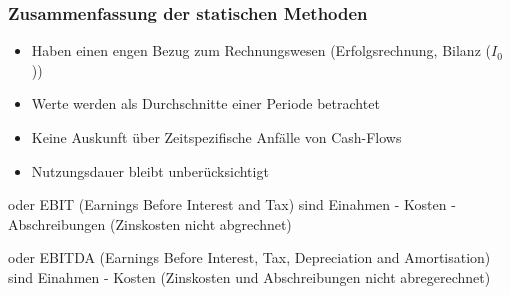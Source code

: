 \subsubsection{Zusammenfassung der statischen Methoden}
\begin{itemize}
    \item Haben einen engen Bezug zum Rechnungswesen (Erfolgsrechnung, Bilanz ($I_0$))
    \item Werte werden als Durchschnitte einer Periode betrachtet
    \item Keine Auskunft über Zeitspezifische Anfälle von Cash-Flows
    \item Nutzungsdauer bleibt unberücksichtigt
\end{itemize} 

\begin{definition}
     oder EBIT (Earnings Before Interest and Tax) sind Einahmen - Kosten - Abschreibungen (Zinskosten nicht abgrechnet)
\end{definition}
\begin{definition}
     oder EBITDA (Earnings Before Interest, Tax, Depreciation and Amortisation) sind Einahmen - Kosten (Zinskosten und Abschreibungen nicht abregerechnet)
\end{definition}

